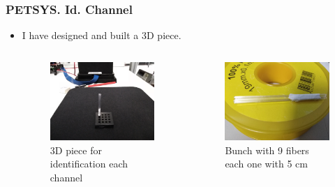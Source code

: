\documentclass{beamer}
\begin{document}
\begin{frame}
\frametitle{PETSYS. Id. Channel}
\begin{itemize}
\item{} I have designed and built a 3D piece.

\begin{columns}

\begin{figure}[hbtp]
\centering
\includegraphics[scale=0.04]{PETSYS/Id_channel/3D_piece.jpg}
\caption{3D piece for identification each channel}
\end{figure}


\begin{figure}[hbtp]
\centering
\includegraphics[scale=0.04]{PETSYS/Id_channel/Bunch_9_fibers.jpg}
\caption{Bunch with 9 fibers each one with 5 cm}
\end{figure}

\end{columns}

\end{itemize}

\end{frame}
\end{document}

